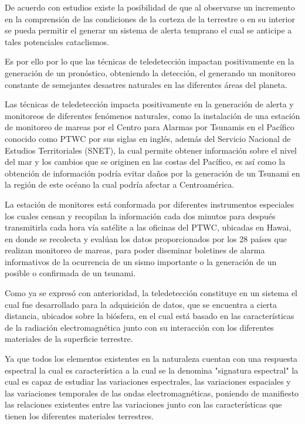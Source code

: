 De acuerdo con estudios existe la posibilidad de que al observarse un incremento en la comprensión de las condiciones de la corteza de la terrestre o en su interior se pueda permitir el generar un sistema de alerta temprano el cual se anticipe a tales potenciales cataclismos.

Es por ello por lo que las técnicas de teledetección impactan positivamente en la generación de un pronóstico, obteniendo la detección, el generando un monitoreo constante de semejantes desastres naturales en las diferentes áreas del planeta. 

Las técnicas de teledetección impacta positivamente en la generación de alerta y monitoreos de diferentes fenómenos naturales, como la instalación de una estación de monitoreo de mareas por el Centro para Alarmas por Tsunamis en el Pacífico conocido como PTWC por sus siglas en inglés, además del Servicio Nacional de Estudios Territoriales (SNET), la cual permite obtener información sobre el nivel del mar y los cambios que se originen en las costas del Pacífico, es así como la obtención de información podría evitar daños por la generación de un Tsunami en la región de este océano la cual podría afectar a Centroamérica.

La estación de monitores está conformada por diferentes instrumentos especiales los cuales censan y recopilan la información cada dos minutos para después transmitirla cada hora vía satélite a las oficinas del PTWC, ubicadas en Hawai, en donde se recolecta y evalúan los datos proporcionados por los 28 países que realizan monitoreo de mareas, para poder diseminar boletines de alarma informativos de la ocurrencia de un sismo importante o la generación de un posible o confirmada de un tsunami.

Como ya se expresó con anterioridad, la teledetección constituye en un sistema el cual fue desarrollado para la adquisición de datos, que se encuentra a cierta distancia, ubicados sobre la biósfera, en el cual está basado en las características de la radiación electromagnética junto con su interacción con los diferentes materiales de la superficie terrestre. 

Ya que todos los elementos existentes en la naturaleza cuentan con una respuesta espectral la cual es característica a la cual se la denomina "signatura espectral" la cual es capaz de estudiar las variaciones espectrales, las variaciones espaciales y las variaciones temporales de las ondas electromagnéticas, poniendo de manifiesto las relaciones existentes entre las variaciones junto con las características que tienen los diferentes materiales terrestres. 

